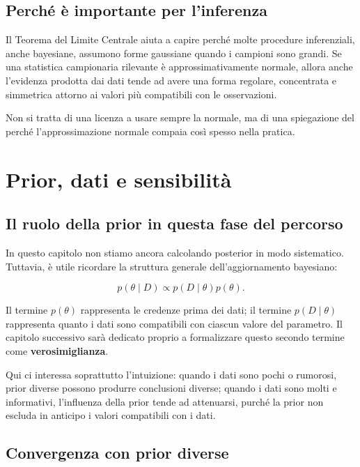 \documentclass[
  italian,
  letterpaper,
  a4paper,
  11pt,
  open=any]{scrbook}
\theoremstyle{plain}
\theoremstyle{definition}
\theoremstyle{definition}
\theoremstyle{remark}
\begin{document}
\subsection{Perché è importante per
l'inferenza}\label{perchuxe9-uxe8-importante-per-linferenza}

Il Teorema del Limite Centrale aiuta a capire perché molte procedure
inferenziali, anche bayesiane, assumono forme gaussiane quando i
campioni sono grandi. Se una statistica campionaria rilevante è
approssimativamente normale, allora anche l'evidenza prodotta dai dati
tende ad avere una forma regolare, concentrata e simmetrica attorno ai
valori più compatibili con le osservazioni.

Non si tratta di una licenza a usare sempre la normale, ma di una
spiegazione del perché l'approssimazione normale compaia così spesso
nella pratica.

\section{Prior, dati e sensibilità}\label{sec-prior-data-sensitivity}

\subsection{Il ruolo della prior in questa fase del
percorso}\label{il-ruolo-della-prior-in-questa-fase-del-percorso}

In questo capitolo non stiamo ancora calcolando posterior in modo
sistematico. Tuttavia, è utile ricordare la struttura generale
dell'aggiornamento bayesiano:

\[
p(\theta \mid D) \propto p(D \mid \theta) p(\theta).
\]

Il termine \(p(\theta)\) rappresenta le credenze prima dei dati; il
termine \(p(D \mid \theta)\) rappresenta quanto i dati sono compatibili
con ciascun valore del parametro. Il capitolo successivo sarà dedicato
proprio a formalizzare questo secondo termine come
\textbf{verosimiglianza}.

Qui ci interessa soprattutto l'intuizione: quando i dati sono pochi o
rumorosi, prior diverse possono produrre conclusioni diverse; quando i
dati sono molti e informativi, l'influenza della prior tende ad
attenuarsi, purché la prior non escluda in anticipo i valori compatibili
con i dati.

\subsection{Convergenza con prior
diverse}\label{convergenza-con-prior-diverse}
\end{document}
